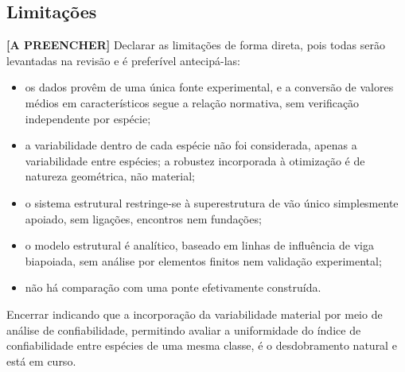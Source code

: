\subsection{Limitações}\label{sec:limitacoes}

\begin{fillblock}
\noindent\textbf{[A PREENCHER]} Declarar as limitações de forma direta, pois todas serão levantadas na revisão e é preferível antecipá-las:

\begin{itemize}[nosep]
\item os dados provêm de uma única fonte experimental, e a conversão de valores médios em característicos segue a relação normativa, sem verificação independente por espécie;
\item a variabilidade dentro de cada espécie não foi considerada, apenas a variabilidade entre espécies; a robustez incorporada à otimização é de natureza geométrica, não material;
\item o sistema estrutural restringe-se à superestrutura de vão único simplesmente apoiado, sem ligações, encontros nem fundações;
\item o modelo estrutural é analítico, baseado em linhas de influência de viga biapoiada, sem análise por elementos finitos nem validação experimental;
\item não há comparação com uma ponte efetivamente construída.
\end{itemize}

Encerrar indicando que a incorporação da variabilidade material por meio de análise de confiabilidade, permitindo avaliar a uniformidade do índice de confiabilidade entre espécies de uma mesma classe, é o desdobramento natural e está em curso.
\end{fillblock}
